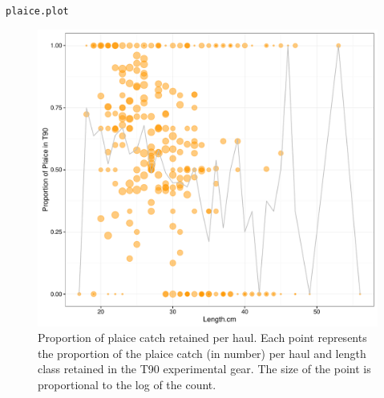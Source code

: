 \documentclass[12pt]{article}\usepackage[]{graphicx}\usepackage[]{color}
\makeatletter
\def\maxwidth{ %
  \ifdim\Gin@nat@width>\linewidth
    \linewidth
  \else
    \Gin@nat@width
  \fi
}
\newcommand{\hlstd}[1]{\textcolor[rgb]{0.345,0.345,0.345}{#1}}%
\newenvironment{kframe}{%
 \def\at@end@of@kframe{}%
 \ifinner\ifhmode%
  \def\at@end@of@kframe{\end{minipage}}%
  \begin{minipage}{\columnwidth}%
 \fi\fi%
 \def\FrameCommand##1{\hskip\@totalleftmargin \hskip-\fboxsep
 \colorbox{shadecolor}{##1}\hskip-\fboxsep
     \hskip-\linewidth \hskip-\@totalleftmargin \hskip\columnwidth}%
 \MakeFramed {\advance\hsize-\width
   \@totalleftmargin\z@ \linewidth\hsize
   \@setminipage}}%
 {\par\unskip\endMakeFramed%
 \at@end@of@kframe}
\newenvironment{knitrout}{}{} %
\makeatother
\begin{document}
\begin{knitrout}
\begin{kframe}
\begin{alltt}
\hlstd{plaice.plot}
\end{alltt}
\end{kframe}\begin{figure}
\includegraphics[width=\maxwidth]{figure/unnamed-chunk-4-1} \caption[Proportion of plaice catch retained per haul]{Proportion of plaice catch retained per haul. Each point represents the proportion of the plaice catch (in number) per haul and length class retained in the T90 experimental gear. The size of the point is proportional to the log of the count.}\label{fig:unnamed-chunk-4}
\end{figure}


\end{knitrout}
\end{document}
